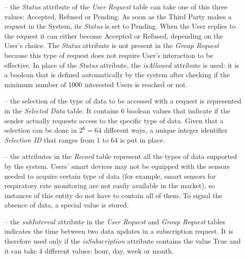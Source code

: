 \begin{itemize}

\item[--] the \textit{Status} attribute of the \textit{User Request} table can take one of this three values: Accepted, Refused or Pending. As soon as the Third Party makes a request in the System, its \textit{Status} is set to Pending. When the User replies to the request it can either become Accepted or Refused, depending on the User's choice.
The \textit{Status} attribute is not present in the \textit{Group Request} because this type of request does not require User's interaction to be effective. In place of the \textit{Status} attribute, the \textit{isAllowed} attribute is used: it is a boolean that is defined automatically by the system after checking if the minimum number of 1000 interested Users is reached or not.

\item[--] the selection of the type of data to be accessed with a request is represented in the \textit{Selected Data} table. It contains 6 boolean values that indicate if the sender actually requests access to the specific type of data.
Given that a selection can be done in $2^6 = 64$ different ways, a unique integer identifier \textit{Selection ID} that ranges from 1 to 64 is put in place.

\item[--] the attributes in the \textit{Record} table represent all the types of data supported by the system. Users’ smart devices may not be equipped with the sensors needed to acquire certain type of data (for example, smart sensors for respiratory rate monitoring are not easily available in the market), so instances of this entity do not have to contain all of them. To signal the absence of data, a special value is stored. 

\item[--] the \textit{subInterval} attribute in the \textit{User Request} and \textit{Group Request} tables indicates the time between two data updates in a subscription request. It is therefore used only if the \textit{isSubscription} attribute contains the value True and it can take 4 different values: hour, day, week or month. 

\end{itemize}